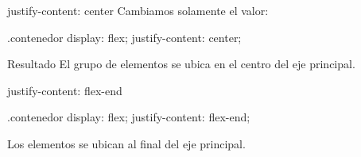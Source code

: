 \documentclass[aspectratio=169,11.5pt]{beamer}
\begin{document}
    \begin{frame}[fragile]{justify-content: center}
        Cambiamos solamente el valor:

        \begin{csscodedark}
            .contenedor {
                display: flex;
                justify-content: center;
            }
        \end{csscodedark}

        \begin{center}
        \end{center}

        \begin{block}{Resultado}
            El grupo de elementos se ubica
            en el centro del eje principal.
        \end{block}
    \end{frame}

    \begin{frame}[fragile]{justify-content: flex-end}
        \begin{csscodedark}
            .contenedor {
                display: flex;
                justify-content: flex-end;
            }
        \end{csscodedark}

        \begin{center}
        \end{center}

        Los elementos se ubican al final
        del eje principal.
    \end{frame}
\end{document}
